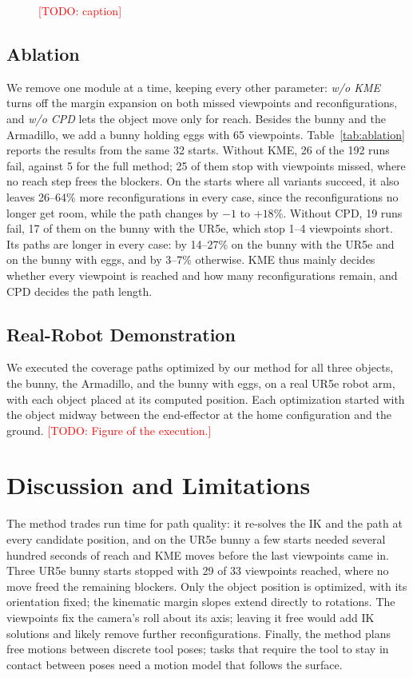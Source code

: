 \documentclass[letterpaper, journal, twoside]{IEEEtran}
\DeclareRobustCommand{\todo}[1]{\textcolor{red}{[TODO: #1]}}  %
\newcommand{\figplaceholder}[2]{\fbox{\parbox[c][#2][c]{0.95\linewidth}{\centering\textcolor{red}{#1}}}}
\begin{document}
\begin{figure}[t]
\centering
\figplaceholder{Tour comparison from one start: ours vs.\ SGD, object position and tool path, reconfigurations marked.}{4cm}
\caption{\todo{caption}}
\label{fig:tour}
\end{figure}

\subsection{Ablation}


We remove one module at a time, keeping every other parameter: \emph{w/o KME} turns off the margin expansion on both missed viewpoints and reconfigurations, and \emph{w/o CPD} lets the object move only for reach. Besides the bunny and the Armadillo, we add a bunny holding eggs with 65 viewpoints. Table~\ref{tab:ablation} reports the results from the same 32 starts. Without KME, 26 of the 192 runs fail, against 5 for the full method; 25 of them stop with viewpoints missed, where no reach step frees the blockers. On the starts where all variants succeed, it also leaves 26--64\% more reconfigurations in every case, since the reconfigurations no longer get room, while the path changes by $-1$ to $+18$\%. Without CPD, 19 runs fail, 17 of them on the bunny with the UR5e, which stop 1--4 viewpoints short. Its paths are longer in every case: by 14--27\% on the bunny with the UR5e and on the bunny with eggs, and by 3--7\% otherwise. KME thus mainly decides whether every viewpoint is reached and how many reconfigurations remain, and CPD decides the path length.

\subsection{Real-Robot Demonstration}
We executed the coverage paths optimized by our method for all three objects, the bunny, the Armadillo, and the bunny with eggs, on a real UR5e robot arm, with each object placed at its computed position. Each optimization started with the object midway between the end-effector at the home configuration and the ground. \todo{Figure of the execution.}

\section{Discussion and Limitations}
The method trades run time for path quality: it re-solves the IK and the path at every candidate position, and on the UR5e bunny a few starts needed several hundred seconds of reach and KME moves before the last viewpoints came in. Three UR5e bunny starts stopped with 29 of 33 viewpoints reached, where no move freed the remaining blockers. Only the object position is optimized, with its orientation fixed; the kinematic margin slopes extend directly to rotations. The viewpoints fix the camera's roll about its axis; leaving it free would add IK solutions and likely remove further reconfigurations. Finally, the method plans free motions between discrete tool poses; tasks that require the tool to stay in contact between poses need a motion model that follows the surface.
\end{document}
